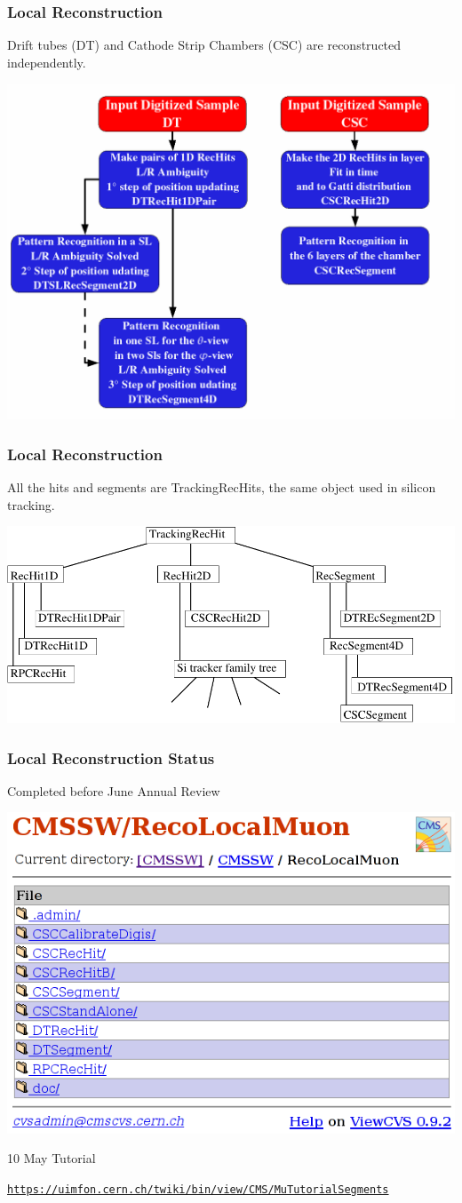 \documentclass[12pt,compress]{beamer}
\begin{document}
\begin{frame}
\frametitle{Local Reconstruction}
Drift tubes (DT) and Cathode Strip Chambers (CSC) are reconstructed independently.

\begin{center}
\includegraphics[width=0.7\linewidth]{local_reco.png}
\end{center}
\end{frame}

\begin{frame}
\frametitle{Local Reconstruction}

All the hits and segments are TrackingRecHits, the same object used in
silicon tracking.

\begin{center}
\includegraphics[width=\linewidth]{family_tree.pdf}
\end{center}
\end{frame}

\begin{frame}
\frametitle{Local Reconstruction Status}
Completed before June Annual Review

\begin{center}
\includegraphics[width=0.5\linewidth]{recolocalmuon.png}
\end{center}

10 May Tutorial

{\tt \scriptsize \href{https://uimfon.cern.ch/twiki/bin/view/CMS/MuTutorialSegments}{https://uimfon.cern.ch/twiki/bin/view/CMS/MuTutorialSegments}}
\end{frame}
\end{document}
